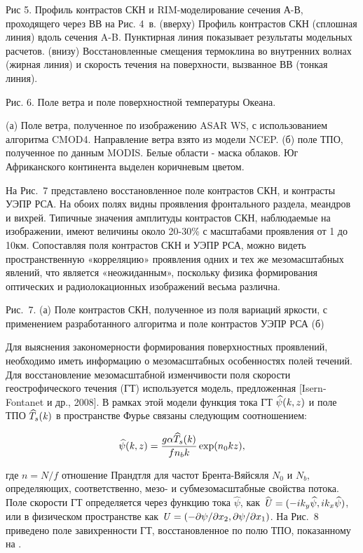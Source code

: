 Рис 5. Профиль контрастов СКН и RIM-моделирование сечения А-В, проходящего через ВВ на Рис. 4~в. (вверху) Профиль контрастов СКН (сплошная линия) вдоль сечения A-B. Пунктирная линия показывает результаты модельных расчетов. (внизу) Восстановленные смещения термоклина во внутренних волнах (жирная линия) и скорость течения на поверхности, вызванное ВВ (тонкая линия).





Рис. 6. Поле ветра и поле поверхностной температуры Океана. 

(а) Поле ветра, полученное по изображению ASAR WS, с использованием алгоритма CMOD4. Направление ветра взято из модели NCEP. (б) поле ТПО, полученное по данным MODIS. Белые области - маска облаков. Юг Африканского континента выделен коричневым цветом.



На Рис.~7 представлено восстановленное поле контрастов СКН, и контрасты УЭПР РСА. На обоих полях видны проявления фронтального раздела, меандров и вихрей. Типичные значения амплитуды контрастов СКН, наблюдаемые на изображении, имеют величины около 20-30\%  с масштабами проявления  от 1 до 10км. Сопоставляя поля контрастов СКН и УЭПР РСА, можно видеть пространственную «корреляцию» проявления одних и тех же мезомасштабных явлений, что является «неожиданным», поскольку физика формирования оптических и радиолокационных изображений весьма различна.

Рис.~7. (а) Поле контрастов СКН, полученное из поля вариаций яркости, с применением разработанного алгоритма и поле контрастов УЭПР РСА (б)



Для выяснения закономерности формирования поверхностных проявлений, необходимо иметь информацию о мезомасштабных особенностях полей течений. Для восстановление мезомасштабной изменчивости поля скорости геострофического течения (ГТ) используется модель, предложенная [Isern-Fontanet и др., 2008]. В рамках этой модели функция тока ГТ $\widehat{\psi }({\it k},z)$ и поле ТПО $\widehat{T}_{s} ({\it k})$ в пространстве Фурье связаны следующим соотношением:

\begin{equation} \label{6)} \widehat{\psi }({\it k},z)=\frac{g\alpha \widehat{T}_{s} ({\it k})}{fn_{b} k} \exp (n_{0} kz),  \end{equation} 

где $n=N/f$ отношение Прандтля для частот Брента-Вяйсяля $N_{0} $ и $N_{b} $, определяющих, соответственно, мезо- и субмезомасштабные свойства потока. Поле скорости ГТ определяется через функцию тока $\widehat{\psi }$, как $\widehat{{\it U}}=(-ik_{y} \widehat{\psi },ik_{x} \widehat{\psi })$, или в физическом пространстве как ${\it U}=(-\partial \psi /\partial x_{2} ,\partial \psi /\partial x_{1} )$. На Рис.~8 приведено поле завихренности ГТ, восстановленное по полю ТПО, показанному на .


